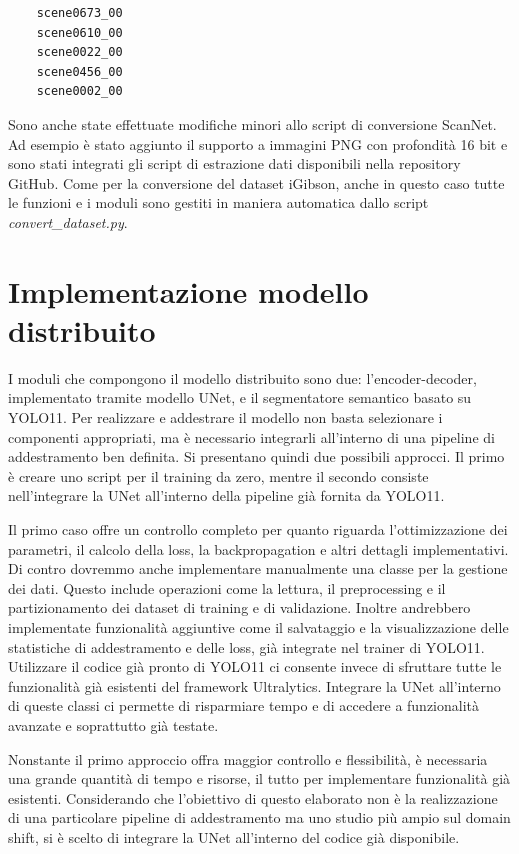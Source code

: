 \documentclass[12pt]{report}
\begin{document}
\begin{verbatim}
	scene0673_00
	scene0610_00
	scene0022_00
	scene0456_00
	scene0002_00
\end{verbatim}

Sono anche state effettuate modifiche minori allo script di conversione ScanNet. Ad esempio è stato aggiunto il supporto a immagini PNG con profondità 16 bit e sono stati integrati gli script di estrazione dati disponibili nella repository GitHub. Come per la conversione del dataset iGibson, anche in questo caso tutte le funzioni e i moduli sono gestiti in maniera automatica dallo script \textit{convert\_dataset.py}.

\section{Implementazione modello distribuito}
\label{sec:implementazione_modello_per_distribuito}

I moduli che compongono il modello distribuito sono due: l'encoder-decoder, implementato tramite modello UNet, e il segmentatore semantico basato su YOLO11. Per realizzare e addestrare il modello non basta selezionare i componenti appropriati, ma è necessario integrarli all'interno di una pipeline di addestramento ben definita. Si presentano quindi due possibili approcci. Il primo è creare uno script per il training da zero, mentre il secondo consiste nell'integrare la UNet all'interno della pipeline già fornita da YOLO11.

Il primo caso offre un controllo completo per quanto riguarda l'ottimizzazione dei parametri, il calcolo della loss, la backpropagation e altri dettagli implementativi. Di contro dovremmo anche implementare manualmente una classe per la gestione dei dati. Questo include operazioni come la lettura, il preprocessing e il partizionamento dei dataset di training e di validazione. Inoltre andrebbero implementate funzionalità aggiuntive come il salvataggio e la visualizzazione delle statistiche di addestramento e delle loss, già integrate nel trainer di YOLO11. Utilizzare il codice già pronto di YOLO11 ci consente invece di sfruttare tutte le funzionalità già esistenti del framework Ultralytics. Integrare la UNet all'interno di queste classi ci permette di risparmiare tempo e di accedere a funzionalità avanzate e soprattutto già testate.

Nonstante il primo approccio offra maggior controllo e flessibilità, è necessaria una grande quantità di tempo e risorse, il tutto per implementare funzionalità già esistenti. Considerando che l'obiettivo di questo elaborato non è la realizzazione di una particolare pipeline di addestramento ma uno studio più ampio sul domain shift, si è scelto di integrare la UNet all'interno del codice già disponibile.
\end{document}
